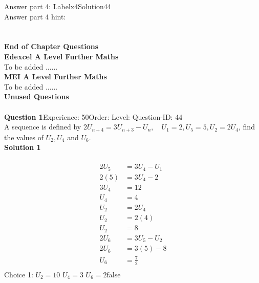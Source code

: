 \documentclass{article}
\begin{document}
Answer part 4: \hspace{10pt}Label\hspace{10pt}x4\hspace{10pt}Solution\hspace{10pt}44\\
Answer part 4 hint: \hspace{15pt}\\
\\[4pt]
\\[2pt]
\noindent\large{\textbf{End of Chapter Questions}}\\[15pt]
\noindent\Huge{\textbf{Edexcel A Level Further Maths}}\\[5pt]
\noindent\large{To be added ......}\\[20pt]
\noindent\Huge{\textbf{MEI A Level Further Maths}}\\[5pt]
\noindent\large{To be added ......}\\[20pt]
\noindent\Huge{\textbf{Unused Questions}}\\[10pt]
\noindent\large{}\\\noindent\textbf{Question 1}\hspace{20pt}Experience: 50\hspace{20pt}Order: \hspace{20pt}Level: \hspace{20pt}Question-ID: 44\\[2pt]
A sequence is defined by $2U_{n+4}=3U_{n+3}-U_n, \quad U_1=2,U_5=5, U_2=2U_4$, find the values of $U_2,U_4$ and $U_6$.\\[4pt]
\noindent\textbf{Solution 1}\\[2pt]
\\[-35pt]\begin{align*}
2U_5&=3U_4-U_1\\[2pt]
2(5)&=3U_4-2\\[2pt]
3U_4&=12\\[2pt]
U_4&=4\\[12pt]
U_2&=2U_4\\[2pt]
U_2&=2(4)\\[2pt]
U_2&=8\\[12pt]
2U_6&=3U_5-U_2\\[2pt]
2U_6&=3(5)-8\\[2pt]
U_6&=\displaystyle\frac{7}{2}\\
\end{align*}
Choice 1: \hspace{20pt}$U_2=10 \,\, U_4=3 \,\, U_6=2 $\hspace{20pt}false\\
\end{document}
